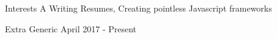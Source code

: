 \documentclass[11pt,letterpaper]{article}
\begin{document}
\begin{rgrp}{Interests A}
\rinterests
{Writing Resumes, Creating pointless Javascript frameworks}
\end{rgrp}

\begin{rgrp}{Extra Generic}
	{April 2017 - Present}
\end{rgrp}



\newif\ifa
\newif\ifb



\atrue
\bfalse

\ifa
	\rheader
	
	
	
	
	
	
\fi

\ifb
	\rheader
	
	\rtitle{Education}
	\rsec{Education Uni}
	
	\rtitle{Projects}
	\rsec{Proj JsJS}
	
	\rsec{Interests A}
	
	\rtitle{Extracurriculars}
	\rsec{Extra Generic}
	
	\rtitle{Experience}
	\rsec{Exp Generic}
	
	\rtitle{Skills}
	\rsec{Skills I}
\fi
\end{document}
